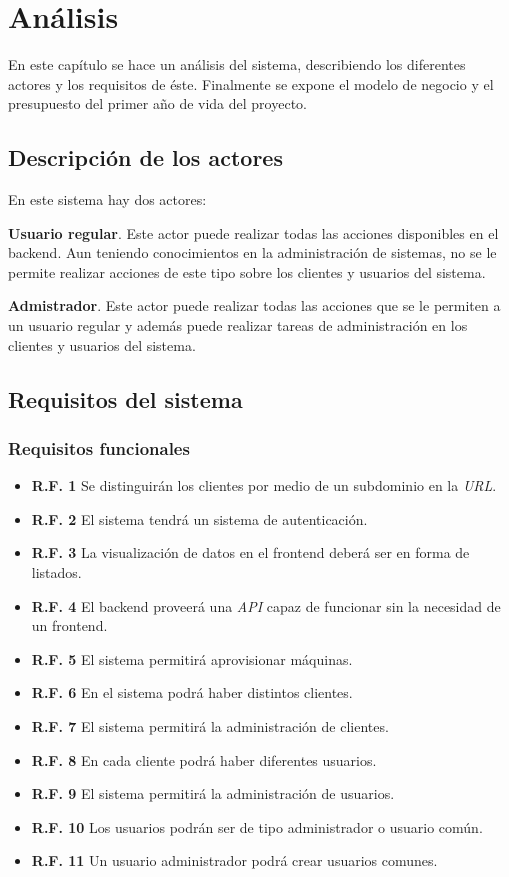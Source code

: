 \chapter{Análisis}

En este capítulo se hace un análisis del sistema, describiendo los diferentes actores y los requisitos de éste. Finalmente se expone el modelo de negocio y el presupuesto del primer año de vida del proyecto.

\section{Descripción de los actores}

En este sistema hay dos actores:

\textbf{Usuario regular}. Este actor puede realizar todas las acciones disponibles en el backend. Aun teniendo conocimientos en la administración de sistemas, no se le permite realizar acciones de este tipo sobre los clientes y usuarios del sistema.

\textbf{Admistrador}. Este actor puede realizar todas las acciones que se le permiten a un usuario regular y además puede realizar tareas de administración en los clientes y usuarios del sistema.

\section{Requisitos del sistema}

\subsection{Requisitos funcionales}
\begin{itemize}
	\item \textbf{R.F. 1} Se distinguirán los clientes por medio de un subdominio en la \textit{URL}.
	\item \textbf{R.F. 2} El sistema tendrá un sistema de autenticación.
	\item \textbf{R.F. 3} La visualización de datos en el frontend deberá ser en forma de listados.
	\item \textbf{R.F. 4} El backend proveerá una \textit{API} capaz de funcionar sin la necesidad de un frontend.
	\item \textbf{R.F. 5} El sistema permitirá aprovisionar máquinas.
	\item \textbf{R.F. 6} En el sistema podrá haber distintos clientes.
	\item \textbf{R.F. 7} El sistema permitirá la administración de clientes.
	\item \textbf{R.F. 8} En cada cliente podrá haber diferentes usuarios.
	\item \textbf{R.F. 9} El sistema permitirá la administración de usuarios.
	\item \textbf{R.F. 10} Los usuarios podrán ser de tipo administrador o usuario común.
	\item \textbf{R.F. 11} Un usuario administrador podrá crear usuarios comunes.
\end{itemize}


